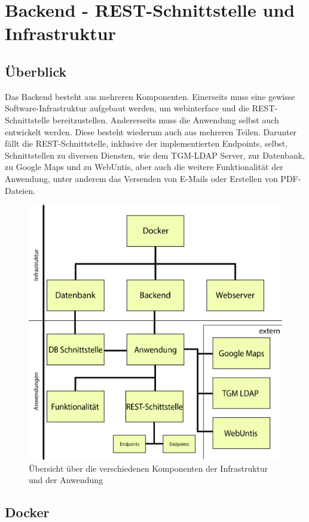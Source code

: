 \section{Backend - REST-Schnittstelle und Infrastruktur}
	\subsection{Überblick}
	Das Backend besteht aus mehreren Komponenten. Einerseits muss eine gewisse Software-Infrastruktur aufgebaut werden, um \Gls{webinterface} und die REST-Schnittstelle bereitzustellen. Andererseits muss die Anwendung selbst auch entwickelt werden. Diese besteht wiederum auch aus mehreren Teilen. Darunter fällt die REST-Schnittstelle, inklusive der implementierten Endpoints, selbst, Schnittstellen zu diversen Diensten, wie dem TGM-LDAP Server, zur Datenbank, zu Google Maps und zu WebUntis, aber auch die weitere Funktionalität der Anwendung, unter anderem das Versenden von E-Mails oder Erstellen von PDF-Dateien.
	\\
	\begin{figure}[H]
		\centering
		\includegraphics[width=0.8\linewidth]{images/uebersicht}
		\caption[Übersicht über die Komponenten]{Übersicht über die verschiedenen Komponenten der Infrastruktur und der Anwendung}
		\label{fig:uebersicht}
	\end{figure}
	
	\subsection{Docker}

